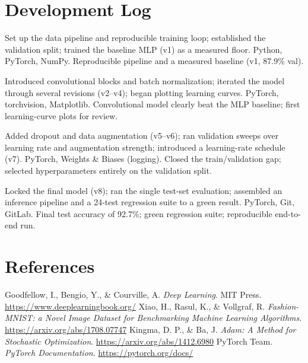 \documentclass[11pt,a4paper]{report}
\begin{document}
\chapter*{Development Log}

  {Set up the data pipeline and reproducible training loop; established the
   validation split; trained the baseline MLP (v1) as a measured floor.}
  {Python, PyTorch, NumPy.}
  {Reproducible pipeline and a measured baseline (v1, 87.9\% val).}

  {Introduced convolutional blocks and batch normalization; iterated the
   model through several revisions (v2--v4); began plotting learning curves.}
  {PyTorch, torchvision, Matplotlib.}
  {Convolutional model clearly beat the MLP baseline; first learning-curve
   plots for review.}

  {Added dropout and data augmentation (v5--v6); ran validation sweeps over
   learning rate and augmentation strength; introduced a learning-rate
   schedule (v7).}
  {PyTorch, Weights \& Biases (logging).}
  {Closed the train/validation gap; selected hyperparameters entirely on the
   validation split.}

  {Locked the final model (v8); ran the single test-set evaluation;
   assembled an inference pipeline and a 24-test regression suite to a green
   result.}
  {PyTorch, Git, GitLab.}
  {Final test accuracy of 92.7\%; green regression suite; reproducible
   end-to-end run.}

\chapter*{References}
\begin{utadrefs}
\utadref Goodfellow, I., Bengio, Y., \& Courville, A. \emph{Deep Learning}.
  MIT Press. \url{https://www.deeplearningbook.org/}
\utadref Xiao, H., Rasul, K., \& Vollgraf, R. \emph{Fashion-MNIST: a Novel
  Image Dataset for Benchmarking Machine Learning Algorithms}.
  \url{https://arxiv.org/abs/1708.07747}
\utadref Kingma, D. P., \& Ba, J. \emph{Adam: A Method for Stochastic
  Optimization}. \url{https://arxiv.org/abs/1412.6980}
\utadref PyTorch Team. \emph{PyTorch Documentation}.
  \url{https://pytorch.org/docs/}
\end{utadrefs}
\end{document}
